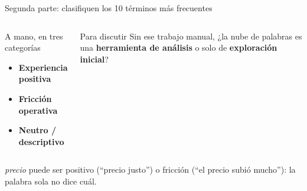 \documentclass[aspectratio=169,xcolor=dvipsnames]{beamer}
\begin{document}
\begin{frame}{Segunda parte: clasifiquen los 10 términos más frecuentes}
\begin{columns}[T]
  \begin{block}{A mano, en tres categorías}
    \small
    \begin{itemize}
      \item \textbf{Experiencia positiva}
      \item \textbf{Fricción operativa}
      \item \textbf{Neutro / descriptivo}
    \end{itemize}
  \end{block}
  \begin{alertblock}{Para discutir}
    \small Sin ese trabajo manual, ¿la nube de palabras es una \textbf{herramienta de análisis} o solo de \textbf{exploración inicial}?
  \end{alertblock}
\end{columns}
\vspace{6pt}
\begin{center}\small \textit{precio} puede ser positivo (\enquote{precio justo}) o fricción (\enquote{el precio subió mucho}): la palabra sola no dice cuál.\end{center}
\end{frame}
\end{document}
